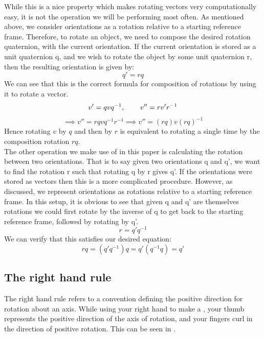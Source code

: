 While this is a nice property which makes rotating vectors very computationally easy, it is not the operation we will be performing most often. As mentioned above, we consider orientations as a rotation relative to a starting reference frame. Therefore, to rotate an object, we need to compose the desired rotation quaternion, with the current orientation. If the current orientation is stored as a unit quaternion q, and we wish to rotate the object by some unit quaternion r, then the resulting orientation is given by:
$$q' = rq$$
We can see that this is the correct formula for composition of rotations by using it to rotate a vector.
$$v' = qvq^{-1}, \operatorname{\operatorname{\: \: \: \:} \operatorname{\: \: \: \:}} v'' = rv'r^{-1}$$
$$\implies v'' = rqvq^{-1}r^{-1} \implies v'' = (rq)v(rq)^{-1}$$
Hence rotating $v$ by $q$ and then by $r$ is equivalent to rotating a single time by the composition rotation $rq$.\\

The other operation we make use of in this paper is calculating the rotation between two orientations. That is to say given two orientations q and q', we want to find the rotation r such that rotating q by r gives q'. If the orientations were stored as vectors then this is a more complicated procedure. However, as discussed, we represent orientations as rotations relative to a starting reference frame. In this setup, it is obvious to see that given q and q' are themselves rotations we could first rotate by the inverse of q to get back to the starting reference frame, followed by rotating by q'.
$$r = q'q^{-1}$$
We can verify that this satisfies our desired equation:
$$rq = (q'q^{-1})q = q'(q^{-1}q) = q'$$


\subsection{The right hand rule}
\label{subsec:right-hand-rule}
The right hand rule refers to a convention defining the positive direction for rotation about an axis. While using your right hand to make a , your thumb represents the positive direction of the axis of rotation, and your fingers curl in the direction of positive rotation. This can be seen in .\\

